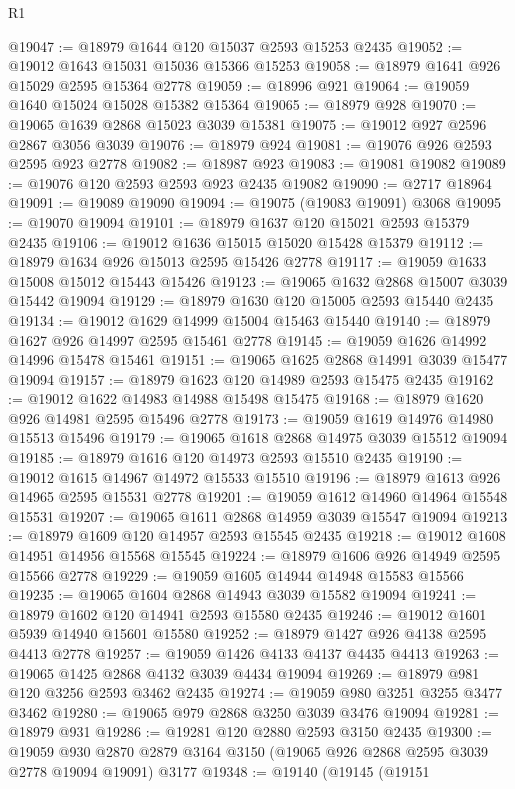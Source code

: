 \begin{lexlean}{R1}
\begin{coremodule}
@19047 := @18979 @1644 @120 @15037 @2593 @15253 @2435
@19052 := @19012 @1643 @15031 @15036 @15366 @15253
@19058 := @18979 @1641 @926 @15029 @2595 @15364 @2778
@19059 := @18996 @921
@19064 := @19059 @1640 @15024 @15028 @15382 @15364
@19065 := @18979 @928
@19070 := @19065 @1639 @2868 @15023 @3039 @15381
@19075 := @19012 @927 @2596 @2867 @3056 @3039
@19076 := @18979 @924
@19081 := @19076 @926 @2593 @2595 @923 @2778
@19082 := @18987 @923
@19083 := @19081 @19082
@19089 := @19076 @120 @2593 @2593 @923 @2435 @19082
@19090 := @2717 @18964
@19091 := @19089 @19090
@19094 := @19075 (@19083 @19091) @3068
@19095 := @19070 @19094
@19101 := @18979 @1637 @120 @15021 @2593 @15379 @2435
@19106 := @19012 @1636 @15015 @15020 @15428 @15379
@19112 := @18979 @1634 @926 @15013 @2595 @15426 @2778
@19117 := @19059 @1633 @15008 @15012 @15443 @15426
@19123 := @19065 @1632 @2868 @15007 @3039 @15442 @19094
@19129 := @18979 @1630 @120 @15005 @2593 @15440 @2435
@19134 := @19012 @1629 @14999 @15004 @15463 @15440
@19140 := @18979 @1627 @926 @14997 @2595 @15461 @2778
@19145 := @19059 @1626 @14992 @14996 @15478 @15461
@19151 := @19065 @1625 @2868 @14991 @3039 @15477 @19094
@19157 := @18979 @1623 @120 @14989 @2593 @15475 @2435
@19162 := @19012 @1622 @14983 @14988 @15498 @15475
@19168 := @18979 @1620 @926 @14981 @2595 @15496 @2778
@19173 := @19059 @1619 @14976 @14980 @15513 @15496
@19179 := @19065 @1618 @2868 @14975 @3039 @15512 @19094
@19185 := @18979 @1616 @120 @14973 @2593 @15510 @2435
@19190 := @19012 @1615 @14967 @14972 @15533 @15510
@19196 := @18979 @1613 @926 @14965 @2595 @15531 @2778
@19201 := @19059 @1612 @14960 @14964 @15548 @15531
@19207 := @19065 @1611 @2868 @14959 @3039 @15547 @19094
@19213 := @18979 @1609 @120 @14957 @2593 @15545 @2435
@19218 := @19012 @1608 @14951 @14956 @15568 @15545
@19224 := @18979 @1606 @926 @14949 @2595 @15566 @2778
@19229 := @19059 @1605 @14944 @14948 @15583 @15566
@19235 := @19065 @1604 @2868 @14943 @3039 @15582 @19094
@19241 := @18979 @1602 @120 @14941 @2593 @15580 @2435
@19246 := @19012 @1601 @5939 @14940 @15601 @15580
@19252 := @18979 @1427 @926 @4138 @2595 @4413 @2778
@19257 := @19059 @1426 @4133 @4137 @4435 @4413
@19263 := @19065 @1425 @2868 @4132 @3039 @4434 @19094
@19269 := @18979 @981 @120 @3256 @2593 @3462 @2435
@19274 := @19059 @980 @3251 @3255 @3477 @3462
@19280 := @19065 @979 @2868 @3250 @3039 @3476 @19094
@19281 := @18979 @931
@19286 := @19281 @120 @2880 @2593 @3150 @2435
@19300 := @19059
    @930
    @2870
    @2879
    @3164
    @3150
    (@19065 @926 @2868 @2595 @3039 @2778 @19094 @19091)
    @3177
@19348 := @19140
    (@19145
      (@19151

\end{coremodule}
\end{lexlean}
